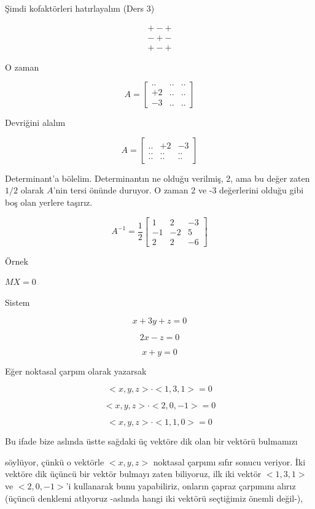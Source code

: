 \documentclass[12pt,fleqn]{article}\usepackage{../../common}
\begin{document}
Şimdi kofaktörleri hatırlayalım (Ders 3)

$$ 
\begin{array}{rr}
+ - + \\
- + - \\
+ - + 
\end{array}
 $$

O zaman

$$ A = 
\left[\begin{array}{rrr}
.. & .. & ..\\
+2 & .. & ..\\
-3 & .. & ..
\end{array}\right]
 $$

Devriğini alalım

$$ A = 
\left[\begin{array}{rrr}
.. & +2 & -3\\
.. & .. & ..\\
.. & .. & ..
\end{array}\right]
 $$

Determinant'a bölelim. Determinantın ne olduğu verilmiş, 2, ama bu değer zaten
$1/2$ olarak $A$'nin tersi önünde duruyor. O zaman 2 ve -3 değerlerini olduğu
gibi boş olan yerlere taşırız.

$$ A^{-1} = \frac{1}{2}
\left[\begin{array}{rrr}
1 & 2 & -3 \\
-1 & -2 & 5 \\
2 & 2 & -6
\end{array}\right]
 $$

Örnek

$MX = 0$

Sistem

$$ x + 3y + z = 0 $$

$$ 2x - z  = 0$$

$$ x + y = 0 $$

Eğer noktasal çarpım olarak yazarsak 

$$ < x,y,z > \cdot < 1,3,1 > = 0 $$

$$ < x,y,z > \cdot < 2,0,-1 > = 0 $$

$$ < x,y,z > \cdot < 1,1,0 > = 0 $$

Bu ifade bize aslında üstte sağdaki üç vektöre dik olan bir vektörü bulmamızı

söylüyor, çünkü o vektörle $< x,y,z >$ noktasal çarpımı sıfır sonucu veriyor. İki
vektöre dik üçüncü bir vektör bulmayı zaten biliyoruz, ilk iki vektör $< 1,3,1 >$
ve $< 2,0,-1 >$'i kullanarak bunu yapabiliriz, onların çapraz çarpımını
alırız (üçüncü denklemi atlıyoruz -aslında hangi iki vektörü seçtiğimiz önemli
değil-),
\end{document}
